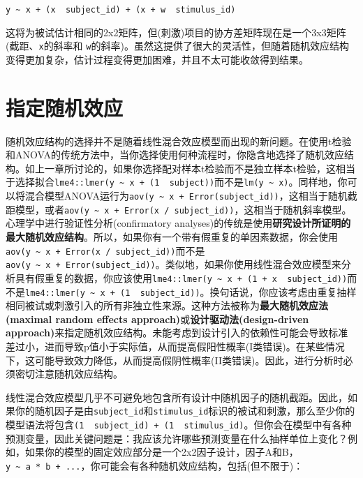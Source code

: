 \documentclass[
]{book}
\begin{document}
\texttt{y\ \textasciitilde{}\ x\ +\ (x\ \textbar{}\ subject\_id)\ +\ (x\ +\ w\ \textbar{}\ stimulus\_id)}

这将为被试估计相同的2x2矩阵，但(刺激)项目的协方差矩阵现在是一个3x3矩阵(截距、\texttt{x}的斜率和 \texttt{w}的斜率)。虽然这提供了很大的灵活性，但随着随机效应结构变得更加复杂，估计过程变得更加困难，并且不太可能收敛得到结果。

\hypertarget{ux6307ux5b9aux968fux673aux6548ux5e94}{%
\section{指定随机效应}\label{ux6307ux5b9aux968fux673aux6548ux5e94}}

随机效应结构的选择并不是随着线性混合效应模型而出现的新问题。在使用t检验和ANOVA的传统方法中，当你选择使用何种流程时，你隐含地选择了随机效应结构。如上一章所讨论的，如果你选择配对样本t检验而不是独立样本t检验，这相当于选择拟合\texttt{lme4::lmer(y\ \textasciitilde{}\ x\ +\ (1\ \textbar{}\ subject))}而不是\texttt{lm(y\ \textasciitilde{}\ x)}。同样地，你可以将混合模型ANOVA运行为\texttt{aov(y\ \textasciitilde{}\ x\ +\ Error(subject\_id))}，这相当于随机截距模型，或者\texttt{aov(y\ \textasciitilde{}\ x\ +\ Error(x\ /\ subject\_id))}，这相当于随机斜率模型。心理学中进行验证性分析(confirmatory analyses)的传统是使用\textbf{研究设计所证明的最大随机效应结构}。所以，如果你有一个带有假重复的单因素数据，你会使用\texttt{aov(y\ \textasciitilde{}\ x\ +\ Error(x\ /\ subject\_id))}而不是\texttt{aov(y\ \textasciitilde{}\ x\ +\ Error(subject\_id))}。类似地，如果你使用线性混合效应模型来分析具有假重复的数据，你应该使用\texttt{lme4::lmer(y\ \textasciitilde{}\ x\ +\ (1\ +\ x\ \textbar{}\ subject\_id))}而不是\texttt{lme4::lmer(y\ \textasciitilde{}\ x\ +\ (1\ \textbar{}\ subject\_id))}。换句话说，你应该考虑由重复抽样相同被试或刺激引入的所有非独立性来源。这种方法被称为\textbf{最大随机效应法(maximal random effects approach)}或\textbf{设计驱动法(design-driven approach)}来指定随机效应结构\citep{Barr_et_al_2013}。未能考虑到设计引入的依赖性可能会导致标准差过小，进而导致p值小于实际值，从而提高假阳性概率(I类错误)。在某些情况下，这可能导致效力降低，从而提高假阴性概率(II类错误)。因此，进行分析时必须密切注意随机效应结构。

线性混合效应模型几乎不可避免地包含所有设计中随机因子的随机截距。因此，如果你的随机因子是由\texttt{subject\_id}和\texttt{stimulus\_id}标识的被试和刺激，那么至少你的模型语法将包含\texttt{(1\ \textbar{}\ subject\_id)\ +\ (1\ \textbar{}\ stimulus\_id)}。但你会在模型中有各种预测变量，因此关键问题是：我应该允许哪些预测变量在什么抽样单位上变化？例如，如果你的模型的固定效应部分是一个2x2因子设计，因子A和B，\texttt{y\ \textasciitilde{}\ a\ *\ b\ +\ ...}，你可能会有各种随机效应结构，包括(但不限于)：
\end{document}
